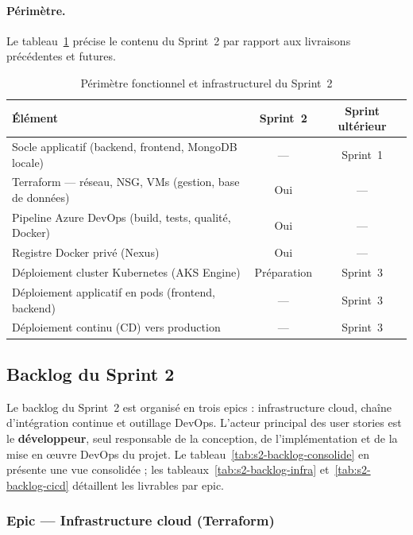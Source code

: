 \paragraph{Périmètre.}
Le tableau~\ref{tab:s2-perimetre} précise le contenu du Sprint~2 par rapport aux livraisons
précédentes et futures.

\begin{table}[H]
\centering
\footnotesize
\renewcommand{\arraystretch}{1.1}
\setlength{\tabcolsep}{6pt}
\begin{tabular}{|p{5.5cm}|c|c|}
\hline
\textbf{Élément} & \textbf{Sprint~2} & \textbf{Sprint ultérieur} \\
\hline
Socle applicatif (backend, frontend, MongoDB locale) & — & Sprint~1 \\
\hline
Terraform — réseau, NSG, VMs (gestion, base de données) & Oui & — \\
\hline
Pipeline Azure DevOps (build, tests, qualité, Docker) & Oui & — \\
\hline
Registre Docker privé (Nexus) & Oui & — \\
\hline
Déploiement cluster Kubernetes (AKS Engine) & Préparation & Sprint~3 \\
\hline
Déploiement applicatif en pods (frontend, backend) & — & Sprint~3 \\
\hline
Déploiement continu (CD) vers production & — & Sprint~3 \\
\hline
\end{tabular}
\caption{Périmètre fonctionnel et infrastructurel du Sprint~2}
\label{tab:s2-perimetre}
\end{table}


\subsection{Backlog du Sprint 2}

Le backlog du Sprint~2 est organisé en trois epics : infrastructure cloud, chaîne
d'intégration continue et outillage DevOps. L'acteur principal des user stories est le
\textbf{développeur}, seul responsable de la conception, de l'implémentation et de la mise en
œuvre DevOps du projet. Le tableau~\ref{tab:s2-backlog-consolide} en présente une vue
consolidée ; les tableaux~\ref{tab:s2-backlog-infra} et~\ref{tab:s2-backlog-cicd} détaillent
les livrables par epic.

\subsubsection{Epic — Infrastructure cloud (Terraform)}

